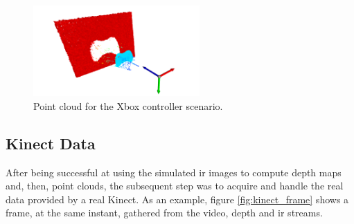 \documentclass[journal]{IEEEtran}
\begin{document}
\begin{figure}[!t]
    \centering
    \includegraphics[width=2.5in]{imgs/XboxController/pc.png}
    \caption{Point cloud for the Xbox controller scenario.}
    \label{fig:xbox_pc}
\end{figure}

\subsection{Kinect Data}

After being successful at using the simulated \gls{ir} images to compute depth maps and, then, point clouds, the subsequent step was to acquire and handle the real data provided by a real Kinect. As an example, figure \ref{fig:kinect_frame} shows a frame, at the same instant, gathered from the video, depth and \gls{ir} streams.
\end{document}
